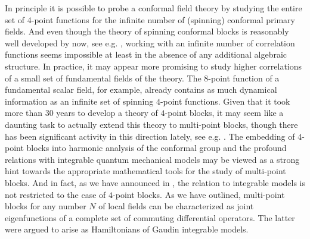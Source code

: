\documentclass{article}
\begin{document}
In principle it is possible to probe a conformal field theory by studying the entire 
set of 4-point functions for the infinite number of (spinning) conformal primary fields. 
And even though the theory of spinning conformal blocks is reasonably well developed
by now, see e.g. \cite{Costa:2011dw,Costa:2011mg,Echeverri:2016dun,Karateev:2017jgd}, 
working with an infinite number of correlation functions seems impossible at least in 
the absence of any additional algebraic structure. In practice, it may appear more 
promising to study higher correlations of a small set of fundamental fields of the 
theory. The $8$-point function of a fundamental scalar field, for example, already contains as much dynamical information as an infinite set of spinning $4$-point functions. 
Given that it took more than 30 years to develop a theory of $4$-point blocks, it may seem 
like a daunting task to actually extend this theory to multi-point blocks, though there 
has been significant activity in this direction lately, see e.g. \cite{Rosenhaus:2018zqn,
Parikh:2019ygo,Fortin:2019dnq,Parikh:2019dvm,Fortin:2019zkm,Irges:2020lgp,Fortin:2020yjz,
Pal:2020dqf,Fortin:2020bfq,Hoback:2020pgj,Goncalves:2019znr,Anous:2020vtw,Fortin:2020zxw,
Poland:2021xjs}. The embedding of $4$-point blocks into harmonic analysis of the conformal 
group and the profound relations with integrable quantum mechanical models may be viewed 
as a strong hint towards the appropriate mathematical tools for the study of multi-point 
blocks. And in fact, as we have announced in \cite{Buric:2020dyz}, the relation to 
integrable models is not restricted to the case of $4$-point blocks. As we have outlined, 
multi-point blocks for any number $N$ of local fields can be characterized as joint 
eigenfunctions of a complete set of commuting differential operators. The latter were 
argued to arise as Hamiltonians of Gaudin integrable models. 
\medskip 
\end{document}
